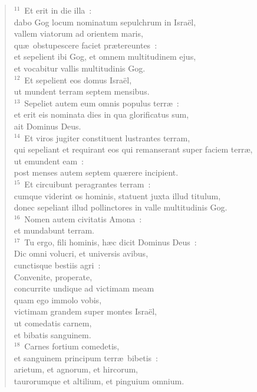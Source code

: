 \begin{verse}${}^{11}$~Et erit in die illa~:\\ dabo Gog locum nominatum sepulchrum in Isra\"el,\\ vallem viatorum ad orientem maris,\\ qu\ae\ obstupescere faciet pr\ae tereuntes~:\\ et sepelient ibi Gog, et omnem multitudinem ejus,\\ et vocabitur vallis multitudinis Gog.\\
${}^{12}$~Et sepelient eos domus Isra\"el,\\ ut mundent terram septem mensibus.\\
${}^{13}$~Sepeliet autem eum omnis populus terr\ae~:\\ et erit eis nominata dies in qua glorificatus sum,\\ ait Dominus Deus.\\
${}^{14}$~Et viros jugiter constituent lustrantes terram,\\ qui sepeliant et requirant eos qui remanserant super faciem terr\ae ,\\ ut emundent eam~:\\ post menses autem septem qu\ae rere incipient.\\
${}^{15}$~Et circuibunt peragrantes terram~:\\ cumque viderint os hominis, statuent juxta illud titulum,\\ donec sepeliant illud pollinctores in valle multitudinis Gog.\\
${}^{16}$~Nomen autem civitatis Amona~:\\ et mundabunt terram.\\
${}^{17}$~Tu ergo, fili hominis, h\ae c dicit Dominus Deus~:\\ Dic omni volucri, et universis avibus,\\ cunctisque bestiis agri~:\\ Convenite, properate,\\ concurrite undique ad victimam meam\\ quam ego immolo vobis,\\ victimam grandem super montes Isra\"el,\\ ut comedatis carnem,\\ et bibatis sanguinem.\\
${}^{18}$~Carnes fortium comedetis,\\ et sanguinem principum terr\ae\ bibetis~:\\ arietum, et agnorum, et hircorum,\\ taurorumque et altilium, et pinguium omnium.\\

\end{verse}
